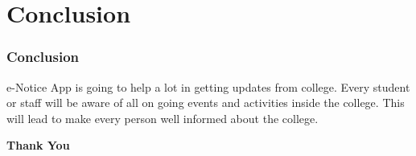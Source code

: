 \documentclass{beamer}   %
\begin{document}
\section{Conclusion}
\begin{frame}
\frametitle{Conclusion}
e-Notice App is going to help a lot in getting updates from college. Every student or staff will be aware of all on going events and activities inside the college. This will lead to make every person well informed about the college.
\end{frame}

\begin{frame}
\begin{center}
\textbf{Thank You}
\end{center}
\end{frame}
\end{document}
